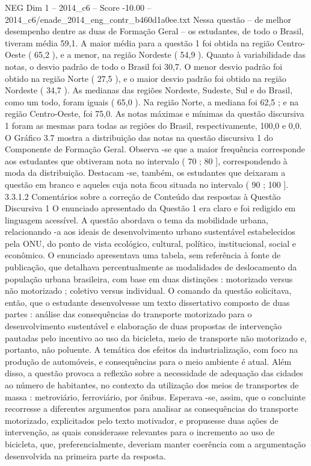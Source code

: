 \begin{textsample}{NEG Dim 1 – 2014\_c6 – Score -10.00 – 2014\_c6/enade\_2014\_eng\_contr\_b460d1a0ee.txt}
Nessa questão – de melhor desempenho dentre as duas de Formação Geral – os estudantes, de todo o Brasil, tiveram média 59,1.
A maior média para a questão 1 foi obtida na região Centro-Oeste ( 65,2 ), e a menor, na região Nordeste ( 54,9 ).
Quanto à variabilidade das notas, o desvio padrão de todo o Brasil foi 30,7.
O menor desvio padrão foi obtido na região Norte ( 27,5 ), e o maior desvio padrão foi obtido na região Nordeste ( 34,7 ).
As medianas das regiões Nordeste, Sudeste, Sul e do Brasil, como um todo, foram iguais ( 65,0 ).
Na região Norte, a mediana foi 62,5 ; e na região Centro-Oeste, foi 75,0.
As notas máximas e mínimas da questão discursiva 1 foram as mesmas para todas as regiões do Brasil, respectivamente, 100,0 e 0,0.
O Gráfico 3.7 mostra a distribuição das notas na questão discursiva 1 do Componente de Formação Geral.
Observa -se que a maior frequência corresponde aos estudantes que obtiveram nota no intervalo ( 70 ; 80 ], correspondendo à moda da distribuição.
Destacam -se, também, os estudantes que deixaram a questão em branco e aqueles cuja nota ficou situada no intervalo ( 90 ; 100 ]. 3.3.1.2 Comentários sobre a correção de Conteúdo das respostas à Questão Discursiva 1 O enunciado apresentado da Questão 1 era claro e foi redigido em linguagem acessível.
A questão abordava o tema da mobilidade urbana, relacionando -a aos ideais de desenvolvimento urbano sustentável estabelecidos pela ONU, do ponto de vista ecológico, cultural, político, institucional, social e econômico.
O enunciado apresentava uma tabela, sem referência à fonte de publicação, que detalhava percentualmente as modalidades de deslocamento da população urbana brasileira, com base em duas distinções : motorizado versus não motorizado ; coletivo versus individual.
O comando da questão solicitava, então, que o estudante desenvolvesse um texto dissertativo composto de duas partes : análise das consequências do transporte motorizado para o desenvolvimento sustentável e elaboração de duas propostas de intervenção pautadas pelo incentivo ao uso da bicicleta, meio de transporte não motorizado e, portanto, não poluente.
A temática dos efeitos da industrialização, com foco na produção de automóveis, e consequências para o meio ambiente é atual.
Além disso, a questão provoca a reflexão sobre a necessidade de adequação das cidades ao número de habitantes, no contexto da utilização dos meios de transportes de massa : metroviário, ferroviário, por ônibus.
Esperava -se, assim, que o concluinte recorresse a diferentes argumentos para analisar as consequências do transporte motorizado, explicitados pelo texto motivador, e propusesse duas ações de intervenção, as quais considerasse relevantes para o incremento ao uso de bicicleta, que, preferencialmente, deveriam manter coerência com a argumentação desenvolvida na primeira parte da resposta.

\end{textsample}
